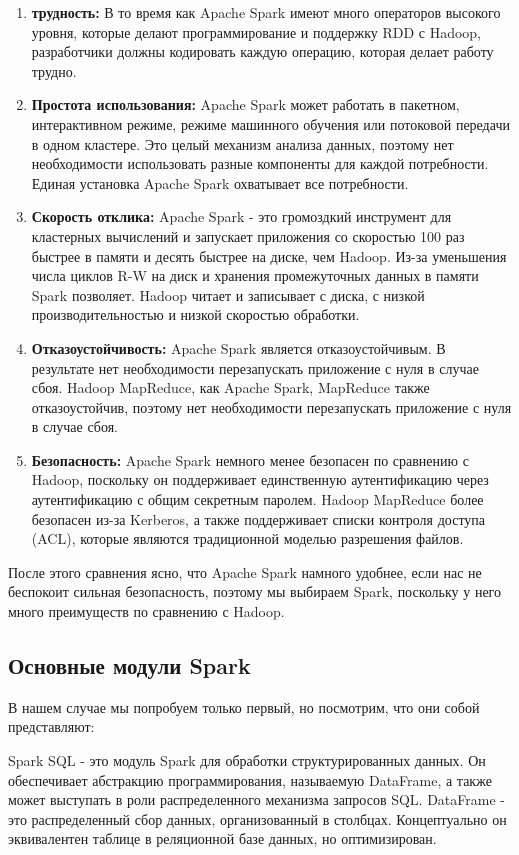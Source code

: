 \begin{enumerate}
	\item \textbf{трудность:} В то время как Apache Spark имеют много операторов высокого уровня, которые делают программирование и поддержку RDD с Hadoop, разработчики должны кодировать каждую операцию, которая делает работу трудно.
	\item \textbf{Простота использования:} Apache Spark может работать в пакетном, интерактивном режиме, режиме машинного обучения или потоковой передачи в одном кластере. Это целый механизм анализа данных, поэтому нет необходимости использовать разные компоненты для каждой потребности. Единая установка Apache Spark охватывает все потребности.
	\item \textbf{Скорость отклика:} Apache Spark - это громоздкий инструмент для кластерных вычислений и запускает приложения со скоростью 100 раз быстрее в памяти и десять быстрее на диске, чем Hadoop. Из-за уменьшения числа циклов R-W на диск и хранения промежуточных данных в памяти Spark позволяет.
Hadoop читает и записывает с диска, с низкой производительностью и низкой скоростью обработки.
	\item \textbf{Отказоустойчивость:} Apache Spark является отказоустойчивым. В результате нет необходимости перезапускать приложение с нуля в случае сбоя. Hadoop MapReduce, как Apache Spark, MapReduce также отказоустойчив, поэтому нет необходимости перезапускать приложение с нуля в случае сбоя.
	\item \textbf{Безопасность:} Apache Spark немного менее безопасен по сравнению с Hadoop, поскольку он поддерживает единственную аутентификацию через аутентификацию с общим секретным паролем. Hadoop MapReduce более безопасен из-за Kerberos, а также поддерживает списки контроля доступа (ACL), которые являются традиционной моделью разрешения файлов.
\end{enumerate}

После этого сравнения ясно, что Apache Spark намного удобнее, если нас не беспокоит сильная безопасность, поэтому мы выбираем Spark, поскольку у него много преимуществ по сравнению с Hadoop\cite{comparison}.


\subsection{Основные модули Spark}

В нашем случае мы попробуем только первый, но посмотрим, что они собой представляют:

Spark SQL - это модуль Spark для обработки структурированных данных. Он обеспечивает абстракцию программирования, называемую DataFrame, а также может выступать в роли распределенного механизма запросов SQL. DataFrame - это распределенный сбор данных, организованный в столбцах.
Концептуально он эквивалентен таблице в реляционной базе данных, но оптимизирован.

